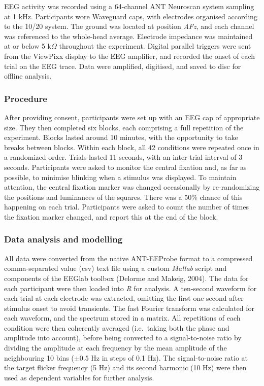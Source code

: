 \documentclass[]{article}
\begin{document}
EEG activity was recorded using a 64-channel ANT Neuroscan system sampling at 1 kHz. Participants wore Waveguard caps, with electrodes organised according to the 10/20 system. The ground was located at position \emph{AFz}, and each channel was referenced to the whole-head average. Electrode impedance was maintained at or below 5 k\(\Omega\) throughout the experiment. Digital parallel triggers were sent from the ViewPixx display to the EEG amplifier, and recorded the onset of each trial on the EEG trace. Data were amplified, digitised, and saved to disc for offline analysis.

\hypertarget{procedure}{%
\subsubsection{Procedure}\label{procedure}}

After providing consent, participants were set up with an EEG cap of appropriate size. They then completed six blocks, each comprising a full repetition of the experiment. Blocks lasted around 10 minutes, with the opportunity to take breaks between blocks. Within each block, all 42 conditions were repeated once in a randomized order. Trials lasted 11 seconds, with an inter-trial interval of 3 seconds. Participants were asked to monitor the central fixation and, as far as possible, to minimise blinking when a stimulus was displayed. To maintain attention, the central fixation marker was changed occasionally by re-randomizing the positions and luminances of the squares. There was a 50\% chance of this happening on each trial. Participants were asked to count the number of times the fixation marker changed, and report this at the end of the block.

\hypertarget{data-analysis-and-modelling}{%
\subsubsection{Data analysis and modelling}\label{data-analysis-and-modelling}}

All data were converted from the native ANT-EEProbe format to a compressed comma-separated value (csv) text file using a custom \emph{Matlab} script and components of the EEGlab toolbox (Delorme and Makeig, 2004). The data for each participant were then loaded into \emph{R} for analysis. A ten-second waveform for each trial at each electrode was extracted, omitting the first one second after stimulus onset to avoid transients. The fast Fourier transform was calculated for each waveform, and the spectrum stored in a matrix. All repetitions of each condition were then coherently averaged (i.e.~taking both the phase and amplitude into account), before being converted to a signal-to-noise ratio by dividing the amplitude at each frequency by the mean amplitude of the neighbouring 10 bins (\(\pm0.5\) Hz in steps of 0.1 Hz). The signal-to-noise ratio at the target flicker frequency (5 Hz) and its second harmonic (10 Hz) were then used as dependent variables for further analysis.
\end{document}
